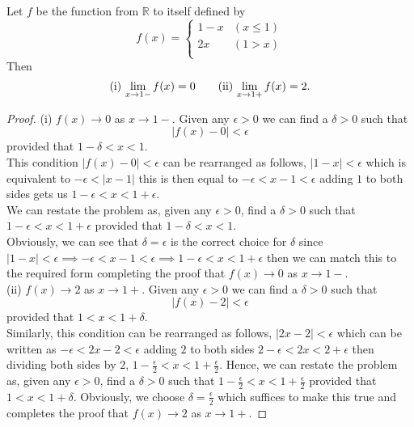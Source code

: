 \documentclass[10pt, a4paper]{article}
\newcommand{\R}{\mathbb{R}}
\begin{document}
\begin{example}
    Let $f$ be the function from $\R$ to itself defined by
    \[ f(x) = \begin{cases}
        1 - x & (x \leq 1) \\
        2x & (1 > x) \\
    \end{cases} \]
    Then 
    \[\textnormal{(i)}\,\lim_{x \rightarrow 1-}{f(x)} = 0\qquad\textnormal{(ii)}\,\lim_{x \rightarrow 1+}{f(x)} = 2.\]
    \begin{proof}
        \textnormal{(i)} $f(x) \rightarrow 0$ as $x \rightarrow 1-$. Given any $\epsilon > 0$ we can find a $\delta > 0$ such that $$|f(x) - 0| < \epsilon$$
        provided that $1 - \delta < x < 1$. \\
        This condition $|f(x) - 0| < \epsilon$ can be rearranged as follows, $|1 - x| < \epsilon$ which is equivalent to $-\epsilon < |x - 1|$ this is then equal to $-\epsilon < x - 1 < \epsilon$ adding $1$ to both sides gets us $1 - \epsilon < x < 1 + \epsilon$. \\
        We can restate the problem as, given any $\epsilon > 0$, find a $\delta > 0$ such that $1 - \epsilon < x < 1 + \epsilon$ provided that $1 - \delta < x < 1$. \\
        Obviously, we can see that $\delta = \epsilon$ is the correct choice for $\delta$ since $|1 - x| < \epsilon \implies -\epsilon < x - 1 < \epsilon \implies 1 - \epsilon < x < 1 + \epsilon$ then we can match this to the required form completing the proof that $f(x) \rightarrow 0$ as $x \rightarrow 1-$. \\
        \textnormal{(ii)} $f(x) \rightarrow 2$ as $x \rightarrow 1+$. Given any $\epsilon > 0$ we can find a $\delta > 0$ such that $$|f(x) - 2| < \epsilon$$
        provided that $1 < x < 1 + \delta$. \\
        Similarly, this condition can be rearranged as follows, $|2x - 2| < \epsilon$ which can be written as $-\epsilon < 2x - 2 < \epsilon$ adding $2$ to both sides $2 - \epsilon < 2x < 2 + \epsilon$ then dividing both sides by $2$, $1 - \frac{\epsilon}{2} < x < 1 + \frac{\epsilon}{2}$. Hence, we can restate the problem as, given any $\epsilon > 0$, find a $\delta > 0$ such that $1 - \frac{\epsilon}{2} < x < 1 + \frac{\epsilon}{2}$ provided that $1 < x < 1 + \delta$. Obviously, we choose $\delta = \frac{\epsilon}{2}$ which suffices to make this true and completes the proof that $f(x) \rightarrow 2$ as $x \rightarrow 1+$.
    \end{proof}
\end{example}
\end{document}
